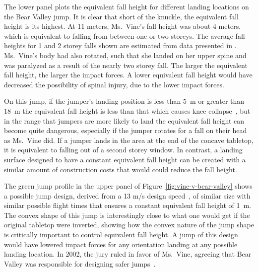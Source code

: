 \documentclass{article}
\begin{document}
The lower panel plots the equivalent fall height for different landing
locations on the Bear Valley jump. It is clear that short of the knuckle, the
equivalent fall height is its highest. At 11 meters, Ms.~Vine's fall height was
about 4 meters, which is equivalent to falling from between one or two storeys.
The average fall heights for 1 and 2 storey falls shown are estimated from data
presented in \cite{Vish2005}.  Ms.~Vine's body had also rotated, such that she
landed on her upper spine and was paralyzed as a result of the nearly two
storey fall. The larger the equivalent fall height, the larger the impact
forces. A lower equivalent fall height would have decreased the possibility of
spinal injury, due to the lower impact forces.

On this jump, if the jumper's landing position is less than 5~\si{\meter} or
greater than 18~\si{\meter} the equivalent fall height is less than that which
causes knee collapse~\cite{Minetti1998}, but in the range that jumpers are more
likely to land the equivalent fall height can become quite dangerous,
especially if the jumper rotates for a fall on their head as Ms.~Vine did. If a
jumper lands in the area at the end of the concave tabletop, it is equivalent
to falling out of a second storey window. In contrast, a landing surface
designed to have a constant equivalent fall height can be created with a
similar amount of construction costs that would could reduce the fall height.

The green jump profile in the upper panel of
Figure~\ref{fig:vine-v-bear-valley} shows a possible jump design, derived from
a 13 m/s design speed~\cite{Levy2015}, of similar size with similar possible
flight times that ensures a constant equivalent fall height of 1~\si{\meter}.
The convex shape of this jump is interestingly close to what one would get if
the original tabletop were inverted, showing how the convex nature of the jump
shape is critically important to control equivalent fall height. A jump of this
design would have lowered impact forces for any orientation landing at any
possible landing location. In 2002, the jury ruled in favor of Ms.~Vine,
agreeing that Bear Valley was responsible for designing safer
jumps~\cite{Alvarado2002}.
\end{document}
